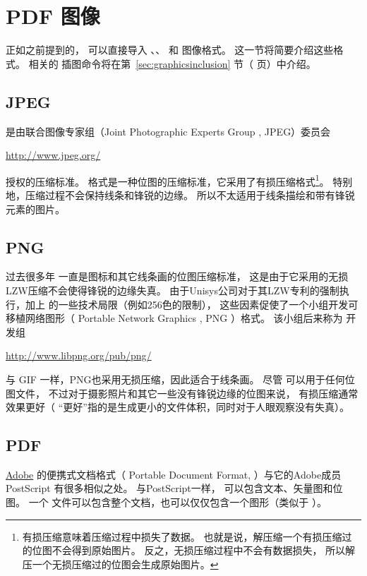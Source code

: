 \section{PDF 图像}\label{sec:pdfgraphics}
正如之前提到的，\pdfTeX{} 可以直接导入 、、 和 \MetaPost{} 图像格式。
这一节将简要介绍这些格式。
相关的\pdfTeX{} 插图命令将在第~\ref{sec:graphicsinclusion} 节（\pageref{sec:graphicsinclusion} 页）中介绍。

\subsection{JPEG}\label{ssec:jpeg}
 是由联合图像专家组（Joint Photographic Experts Group , JPEG）委员会
\begin{center}
	\url{http://www.jpeg.org/}
\end{center}
授权的压缩标准。
 格式是一种位图的压缩标准，它采用了有损压缩格式\footnote{
    有损压缩意味着压缩过程中损失了数据。
	也就是说，解压缩一个有损压缩过的位图不会得到原始图片。
	反之，无损压缩过程中不会有数据损失，
	所以解压一个无损压缩过的位图会生成原始图片。}。
特别地，压缩过程不会保持线条和锋锐的边缘。
所以不太适用于线条描绘和带有锋锐元素的图片。

\subsection{PNG}\label{ssec:png}
过去很多年  一直是图标和其它线条画的位图压缩标准，
这是由于它采用的无损LZW压缩不会使得锋锐的边缘失真。
由于Unisys公司对于其LZW专利的强制执行，加上 的一些技术局限（例如256色的限制），
这些因素促使了一个小组开发可移植网络图形（ Portable Network Graphics , PNG ）格式。
该小组后来称为  开发组
\begin{center}
\url{http://www.libpng.org/pub/png/}
\end{center}
与 GIF 一样，PNG也采用无损压缩，因此适合于线条画。
尽管  可以用于任何位图文件，
不过对于摄影照片和其它一些没有锋锐边缘的位图来说，
 有损压缩通常效果更好（ “更好”指的是生成更小的文件体积，同时对于人眼观察没有失真）。

\subsection{PDF}\label{ssec:pdf}
\href{http://www.adobe.com}{Adobe} 的便携式文档格式（ Portable Document Format,  ）与它的Adobe成员 PostScript 有很多相似之处。
与PostScript一样， 可以包含文本、矢量图和位图。
一个  文件可以包含整个文档，也可以仅仅包含一个图形（类似于  ）。

